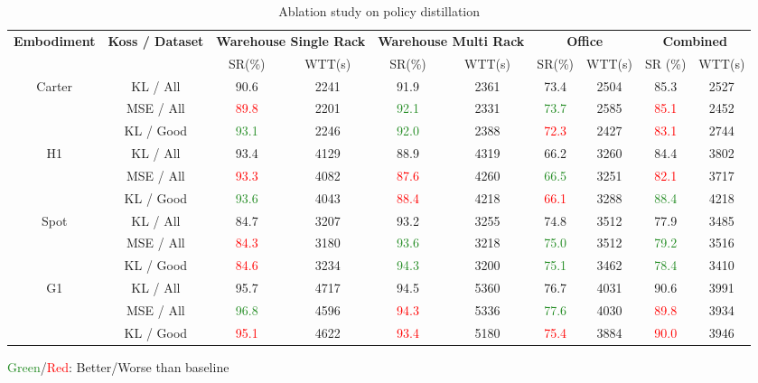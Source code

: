 \documentclass[letterpaper, 10 pt,conference]{ieeeconf}
\begin{document}
\begin{table*}[ht]
    \centering
    \small
    \caption{Ablation study on policy distillation}
    \begin{tabular}{c|c|cc|cc|cc|cc}
        \toprule
        \textbf{Embodiment} & \textbf{Koss / Dataset} & \multicolumn{2}{c|}{\textbf{Warehouse Single Rack}} & \multicolumn{2}{c|}{\textbf{Warehouse Multi Rack}} & \multicolumn{2}{c|}{\textbf{Office}} & \multicolumn{2}{c}{\textbf{Combined}} \\
        & & SR(\%) & WTT(s) & SR(\%) & WTT(s) & SR(\%) & WTT(s) & SR (\%) & WTT(s) \\
        \midrule
        \multirow{3}{*}{Carter} & KL / All & 90.6 & 2241 & 91.9 & 2361 & 73.4 & 2504 & 85.3 & 2527 \\
        & MSE / All & \textcolor{red}{89.8} & 2201 & \textcolor{ForestGreen}{92.1} & 2331 & \textcolor{ForestGreen}{73.7} & 2585 & \textcolor{red}{85.1} & 2452 \\
        & KL / Good & \textcolor{ForestGreen}{93.1} & 2246 & \textcolor{ForestGreen}{92.0} & 2388 & \textcolor{red}{72.3} & 2427 & \textcolor{red}{83.1} & 2744 \\
        \midrule
        \multirow{3}{*}{H1} & KL / All & 93.4 & 4129 & 88.9 & 4319 & 66.2 & 3260 & 84.4 & 3802 \\
        & MSE / All & \textcolor{red}{93.3} & 4082 & \textcolor{red}{87.6} & 4260 & \textcolor{ForestGreen}{66.5} & 3251 & \textcolor{red}{82.1} & 3717 \\
        & KL / Good & \textcolor{ForestGreen}{93.6} & 4043 & \textcolor{red}{88.4} & 4218 & \textcolor{red}{66.1} & 3288 & \textcolor{ForestGreen}{88.4} & 4218 \\
        \midrule
        \multirow{3}{*}{Spot} & KL / All & 84.7 & 3207 & 93.2 & 3255 & 74.8 & 3512 & 77.9 & 3485 \\
        & MSE / All & \textcolor{red}{84.3} & 3180 & \textcolor{ForestGreen}{93.6} & 3218 & \textcolor{ForestGreen}{75.0} & 3512 & \textcolor{ForestGreen}{79.2} & 3516 \\
        & KL / Good & \textcolor{red}{84.6} & 3234 & \textcolor{ForestGreen}{94.3} & 3200 & \textcolor{ForestGreen}{75.1} & 3462 & \textcolor{ForestGreen}{78.4} & 3410 \\
        \midrule
        \multirow{3}{*}{G1} & KL / All & 95.7 & 4717 & 94.5 & 5360 & 76.7 & 4031 & 90.6 & 3991 \\
        & MSE / All & \textcolor{ForestGreen}{96.8} & 4596 & \textcolor{red}{94.3} & 5336 & \textcolor{ForestGreen}{77.6} & 4030 & \textcolor{red}{89.8} & 3934 \\
        & KL / Good & \textcolor{red}{95.1} & 4622 & \textcolor{red}{93.4} & 5180 & \textcolor{red}{75.4} & 3884 & \textcolor{red}{90.0} & 3946 \\
        \bottomrule
    \end{tabular}
    \begin{tablenotes}
    \item \textcolor{ForestGreen}{Green}/\textcolor{red}{Red}: Better/Worse than baseline
    \end{tablenotes}
    \label{tab:ablation_policy_distillation}
\end{table*}
\end{document}
